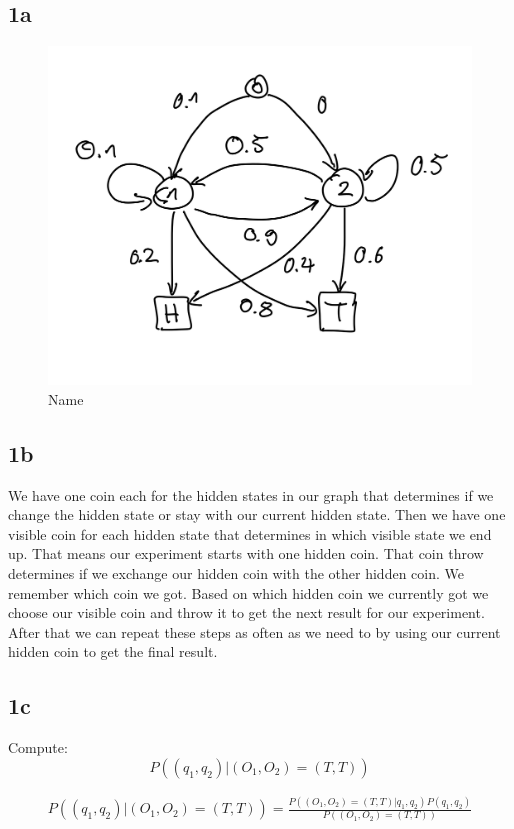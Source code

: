 \subsection*{1a}
\begin{figure}[h]
    \centering
    \includegraphics[width=0.8\linewidth]{hmm.png}
    \caption{Name}
    \label{fig:name}
\end{figure}

\subsection*{1b}
We have one coin each for the hidden states in our graph that determines if we change the hidden state or stay with our current hidden state. 
Then we have one visible coin for each hidden state that determines in which visible state we end up.  
That means our experiment starts with one hidden coin. That coin throw determines if we exchange our hidden coin with the other hidden coin. We remember which coin we got.
Based on which hidden coin we currently got we choose our visible coin and throw it to get the next result for our experiment.
After that we can repeat these steps as often as we need to by using our current hidden coin to get the final result. 


\subsection*{1c}

Compute:
\begin{equation}
    P((q_1, q_2 )| (O_1, O_2) = (T, T))
\end{equation}


\begin{align}
    P((q_1, q_2 )| (O_1, O_2) = (T, T)) =
    \frac{P((O_1, O_2) = (T, T) | q_1, q_2) P(q_1, q_2)}
    {P((O_1, O_2) = (T, T))}
\end{align}

